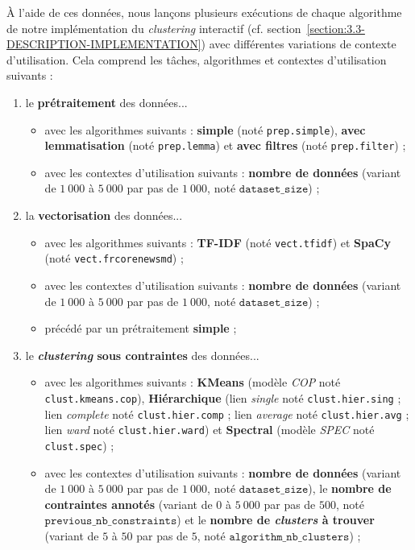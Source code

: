 			À l'aide de ces données, nous lançons plusieurs exécutions de chaque algorithme de notre implémentation du \textit{clustering} interactif (cf. section~\ref{section:3.3-DESCRIPTION-IMPLEMENTATION}) avec différentes variations de contexte d'utilisation.
			Cela comprend les tâches, algorithmes et contextes d'utilisation suivants :
			\begin{enumerate}
				\item le \textbf{prétraitement} des données...
					\begin{itemize}
						\item avec les algorithmes suivants : \textbf{simple} (noté \texttt{prep.simple}), \textbf{avec lemmatisation} (noté \texttt{prep.lemma}) et \textbf{avec filtres} (noté \texttt{prep.filter}) ;
						\item avec les contextes d'utilisation suivants : \textbf{nombre de données} (variant de $1~000$ à $5~000$ par pas de $1~000$, noté $\texttt{dataset\_size}$) ;
					\end{itemize}
				\item la \textbf{vectorisation} des données...
					\begin{itemize}
						\item avec les algorithmes suivants : \textbf{TF-IDF} (noté \texttt{vect.tfidf}) et \textbf{SpaCy} (noté \texttt{vect.frcorenewsmd}) ;
						\item avec les contextes d'utilisation suivants : \textbf{nombre de données} (variant de $1~000$ à $5~000$ par pas de $1~000$, noté $\texttt{dataset\_size}$) ;
						\item précédé par un prétraitement \textbf{simple} ;
					\end{itemize}
				\item le \textbf{\textit{clustering} sous contraintes} des données...
					\begin{itemize}
						\item avec les algorithmes suivants : \textbf{KMeans} (modèle \textit{COP} noté \texttt{clust.kmeans.cop}), \textbf{Hiérarchique} (lien \textit{single} noté \texttt{clust.hier.sing} ; lien \textit{complete} noté \texttt{clust.hier.comp} ; lien \textit{average} noté \texttt{clust.hier.avg} ; lien \textit{ward} noté \texttt{clust.hier.ward}) et \textbf{Spectral} (modèle \textit{SPEC} noté \texttt{clust.spec}) ;
						\item avec les contextes d'utilisation suivants : \textbf{nombre de données} (variant de $1~000$ à $5~000$ par pas de $1~000$, noté $\texttt{dataset\_size}$), le \textbf{nombre de contraintes annotés} (variant de $0$ à $5~000$ par pas de $500$, noté $\texttt{previous\_nb\_constraints}$) et le \textbf{nombre de \textit{clusters} à trouver} (variant de $5$ à $50$ par pas de $5$, noté $\texttt{algorithm\_nb\_clusters}$) ;

\end{itemize}
\end{enumerate}
